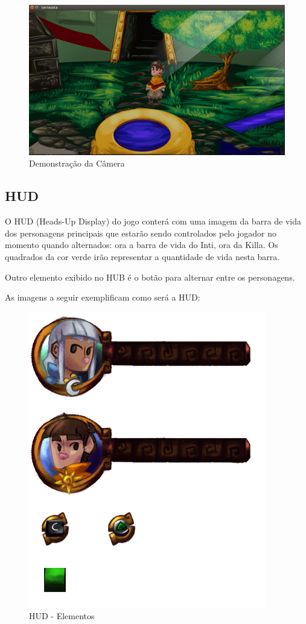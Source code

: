\documentclass[12pt]{article}
\begin{document}
\begin{figure}[!htb]
    \centering
    \includegraphics[scale=0.37]{camera_hud_01.png}
    \caption{Demonstração da Câmera}
    \label{fig:camera_hud_01}
\end{figure}

\subsection{HUD}
O HUD (Heads-Up Display) do jogo conterá com uma imagem da barra de vida dos
personagens principais que estarão sendo controlados pelo jogador no momento
quando alternados: ora a barra de vida do Inti, ora da Killa. Os quadrados da
cor verde irão representar a quantidade de vida nesta barra.

Outro elemento exibido no HUB é o botão para alternar entre os personagens.

As imagens a seguir exemplificam como será a HUD:

\newpage

\begin{figure}[!htb]
    \centering
    \includegraphics[scale=0.45]{camera_hud_02.png}
    \caption{HUD - Elementos}
    \label{fig:camera_hud_02}
\end{figure}
\end{document}
